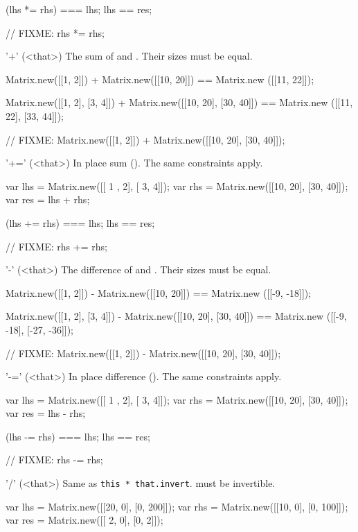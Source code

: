 \begin{urbiscriptapi}
\begin{urbiassert}
(lhs *= rhs) === lhs;
lhs == res;

// FIXME: rhs *= rhs;
\end{urbiassert}


\item['+'](<that>)%
  The sum of \this and \that.  Their sizes must be equal.
\begin{urbiassert}
Matrix.new([[1, 2]]) + Matrix.new([[10, 20]])
  == Matrix.new ([[11, 22]]);

Matrix.new([[1, 2], [3, 4]]) + Matrix.new([[10, 20], [30, 40]])
  == Matrix.new ([[11, 22], [33, 44]]);

// FIXME: Matrix.new([[1, 2]]) + Matrix.new([[10, 20], [30, 40]]);
\end{urbiassert}

\item['+='](<that>)%
  In place sum ().   The same constraints apply.
\begin{urbiassert}
var lhs = Matrix.new([[ 1 , 2], [ 3,  4]]);
var rhs = Matrix.new([[10, 20], [30, 40]]);
var res = lhs + rhs;

(lhs += rhs) === lhs;
lhs == res;

// FIXME: rhs += rhs;
\end{urbiassert}

\item['-'](<that>)%
  The difference of \this and \that.  Their sizes must be equal.
\begin{urbiassert}
Matrix.new([[1, 2]]) - Matrix.new([[10, 20]])
  == Matrix.new ([[-9, -18]]);

Matrix.new([[1, 2], [3, 4]]) - Matrix.new([[10, 20], [30, 40]])
  == Matrix.new ([[-9, -18], [-27, -36]]);

// FIXME: Matrix.new([[1, 2]]) - Matrix.new([[10, 20], [30, 40]]);
\end{urbiassert}


\item['-='](<that>)%
  In place difference ().  The same constraints apply.
\begin{urbiassert}
var lhs = Matrix.new([[ 1 , 2], [ 3,  4]]);
var rhs = Matrix.new([[10, 20], [30, 40]]);
var res = lhs - rhs;

(lhs -= rhs) === lhs;
lhs == res;

// FIXME: rhs -= rhs;
\end{urbiassert}

\item['/'](<that>)%
  Same as \lstinline|this * that.invert|.  \that must be invertible.
\begin{urbiassert}
var lhs = Matrix.new([[20, 0], [0, 200]]);
var rhs = Matrix.new([[10, 0], [0, 100]]);
var res = Matrix.new([[ 2, 0], [0,   2]]);


\end{urbiassert}
\end{urbiscriptapi}
